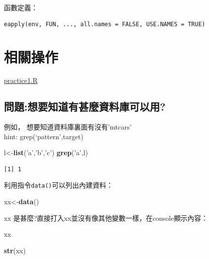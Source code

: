 \documentclass[]{book}
\newenvironment{Shaded}{\begin{snugshade}}{\end{snugshade}}
\newcommand{\KeywordTok}[1]{\textcolor[rgb]{0.13,0.29,0.53}{\textbf{#1}}}
\newcommand{\NormalTok}[1]{#1}
\newcommand{\StringTok}[1]{\textcolor[rgb]{0.31,0.60,0.02}{#1}}
\theoremstyle{definition}
\theoremstyle{definition}
\theoremstyle{definition}
\theoremstyle{remark}
\begin{document}
函數定義：

\begin{verbatim}
eapply(env, FUN, ..., all.names = FALSE, USE.NAMES = TRUE)
\end{verbatim}

\section{相關操作}

\href{resources/practice1.R}{practice1.R}

\subsection{問題:想要知道有甚麼資料庫可以用?}

例如， 想要知道資料庫裏面有沒有'mtcars'\\
hint: grep(`pattern',target)

\begin{Shaded}
\begin{Highlighting}[]
\NormalTok{l<-}\KeywordTok{list}\NormalTok{(}\StringTok{'a'}\NormalTok{,}\StringTok{'b'}\NormalTok{,}\StringTok{'c'}\NormalTok{)}
\KeywordTok{grep}\NormalTok{(}\StringTok{'a'}\NormalTok{,l)}
\end{Highlighting}
\end{Shaded}

\begin{verbatim}
[1] 1
\end{verbatim}

利用指令\texttt{data()}可以列出內建資料：

\begin{Shaded}
\begin{Highlighting}[]
\NormalTok{xx<-}\KeywordTok{data}\NormalTok{()}
\end{Highlighting}
\end{Shaded}

xx 是甚麼?直接打入xx並沒有像其他變數一樣，在console顯示內容：

\begin{Shaded}
\begin{Highlighting}[]
\NormalTok{xx}
\end{Highlighting}
\end{Shaded}

\begin{Shaded}
\begin{Highlighting}[]
\KeywordTok{str}\NormalTok{(xx)}
\end{Highlighting}
\end{Shaded}
\end{document}
